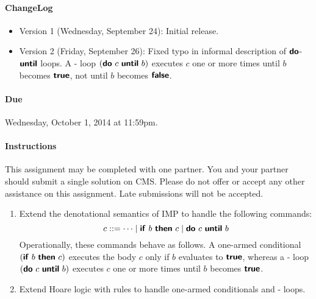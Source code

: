 \documentclass[11pt]{article}
\begin{document}

\vspace*{-1.25\bigskipamount}

\paragraph{ChangeLog}
\begin{itemize}
\item Version 1 (Wednesday, September 24): Initial release.
\item Version 2 (Friday, September 26): Fixed typo in informal description of 
$\text{\textsf{\textbf{do}}}$-$\text{\textsf{\textbf{until}}}$ loops. A -
loop $(\text{\textsf{\textbf{do}}}~c~\text{\textsf{\textbf{until}}}~b)$ executes $c$ one or more times until $b$ becomes
$\text{\textsf{\textbf{true}}}$, not until $b$ becomes $\text{\textsf{\textbf{false}}}$.
\end{itemize}

\paragraph{Due} Wednesday, October 1, 2014 at 11:59pm.

\paragraph{Instructions} This assignment may be completed with one partner. 
You and your partner should submit a single solution on CMS. Please do
not offer or accept any other assistance on this assignment. Late
submissions will not be accepted.

\begin{exercise}
\begin{enumerate}
\item Extend the denotational semantics of IMP to handle the following
  commands:
%
\[
c ::= \dots \mid \text{\textsf{\textbf{if}}}~b~\text{\textsf{\textbf{then}}}~c \mid \text{\textsf{\textbf{do}}}~c~\text{\textsf{\textbf{until}}}~b
\]
%
Operationally, these commands behave as follows. A one-armed
conditional $(\text{\textsf{\textbf{if}}}~b~\text{\textsf{\textbf{then}}}~c)$ executes the body $c$ only if $b$
evaluates to $\text{\textsf{\textbf{true}}}$, whereas a - loop
$(\text{\textsf{\textbf{do}}}~c~\text{\textsf{\textbf{until}}}~b)$ executes $c$ one or more times until $b$ becomes
$\text{\textsf{\textbf{true}}}$.

\item Extend Hoare logic with rules to handle one-armed conditionals
  and - loops.
\end{enumerate}
\end{exercise}
\end{document}
